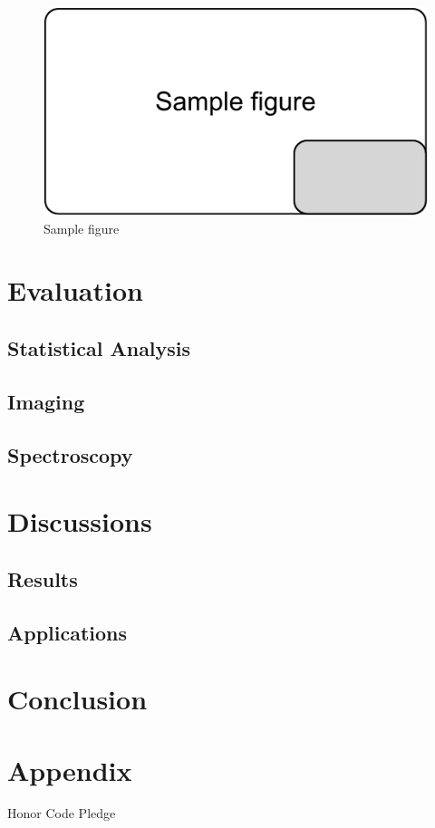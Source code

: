 \documentclass[11pt,sigconf]{acmart}
\begin{document}
\begin{figure}[htbp]
  \centering
  \includegraphics[scale=0.5]{sample-figure}
  \caption{Sample figure}
  \label{fig:sample}
\end{figure}




\section{Evaluation}

 
\subsection{Statistical Analysis}


\subsection{Imaging}


\subsection{Spectroscopy}


\section{Discussions}


\subsection{Results}


\subsection{Applications}




\section{Conclusion}


\section{Appendix}

Honor Code Pledge



 
\end{document}
